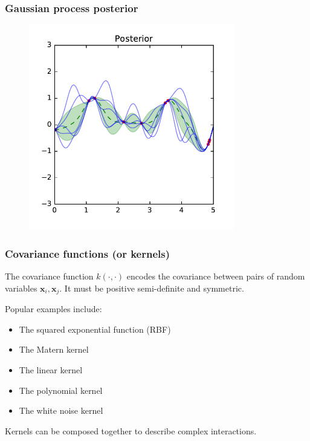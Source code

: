 \documentclass{beamer}
\begin{document}
\begin{frame}
    \frametitle{Gaussian process posterior}

    \begin{figure}
    \includegraphics[width=0.8\textwidth]{./figures/gp-posterior.pdf}
    \end{figure}

\end{frame}


\begin{frame}
    \frametitle{Covariance functions (or kernels)}

    The covariance function $k(\cdot,\cdot)$ encodes the covariance between pairs of random variables $\mathbf{x}_i, \mathbf{x}_j$.
    It must be positive semi-definite and symmetric.

    \vspace{0.5cm}

    Popular examples include:
    \begin{itemize}
        \item The squared exponential function (RBF)
        \item The Matern kernel
        \item The linear kernel
        \item The polynomial kernel
        \item The white noise kernel
    \end{itemize}

    \vspace{0.5cm}

    Kernels can be composed together to describe complex interactions.
\end{frame}
\end{document}
